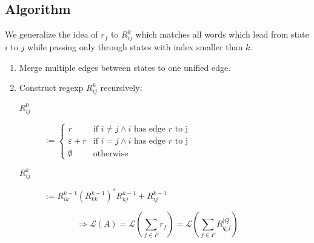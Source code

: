 \documentclass{beamer}
\begin{document}
\subsection*{Algorithm}
\begin{frame}

    We generalize the idea of $r_f$ to $R^k_{i j}$ which matches all words which lead from state $i$ to $j$ while passing only through states with index smaller than $k$.

    \begin{enumerate}
        \item 
            Merge multiple edges between states to one unified edge.
        \item
            Construct regexp $R^k_{i j}$ recursively:

            \begin{description}

                \item[$R^0_{i j}$]
                    $ := \begin{cases} 
                        r & \mbox{if } i \neq j \wedge i \mbox{ has edge } r \mbox{ to j}  \\
                        \varepsilon + r & \mbox{if } i = j \wedge i \mbox{ has edge } r \mbox{ to j}  \\
                        \emptyset & \mbox{otherwise}
                    \end{cases}
                    $ 

                \item[$R^k_{i j}$]
                    $ := R^{k-1}_{i k} (R^{k-1}_{k k})^* R^{k-1}_{k j} + R^{k-1}_{i j}$

            \end{description}

    \end{enumerate}

    \begin{equation*} 
        \Rightarrow \mathcal{L}(A) = \mathcal{L}(\sum_{f \in F} r_f) = \mathcal{L}(\sum_{f \in F} R^{|Q|}_{q_0 f}) 
    \end{equation*}

\end{frame}
\end{document}
